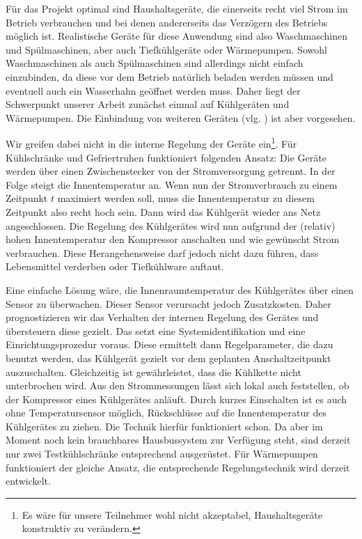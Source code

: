 \documentclass[logo]{fhgart}
\begin{document}
Für das Projekt optimal sind Haushaltsgeräte, die einerseits recht viel
Strom im Betrieb verbrauchen und bei denen andererseits das Verzögern
des Betriebs möglich ist. Realistische Geräte für diese Anwendung sind
also Waschmaschinen und Spülmaschinen, aber auch Tiefkühlgeräte oder
Wärmepumpen. Sowohl Waschmaschinen als auch Spülmaschinen sind
allerdings nicht einfach einzubinden, da diese vor dem Betrieb natürlich
beladen werden müssen und eventuell auch ein Wasserhahn geöffnet werden
muss. Daher liegt der Schwerpunkt unserer Arbeit zunächst einmal auf
Kühlgeräten und Wärmepumpen. Die Einbindung von weiteren Geräten
(vlg. \cite[S. 22]{wiechmann08lastmanagement}) ist aber vorgesehen.

Wir greifen dabei nicht in die interne Regelung der Geräte
ein\footnote{Es wäre für unsere Teilnehmer wohl nicht akzeptabel,
Haushaltsgeräte konstruktiv zu verändern.}. Für
Kühlschränke und Gefriertruhen funktioniert folgenden Ansatz: Die
Geräte werden über einen Zwischenstecker von der Stromversorgung
getrennt. In der Folge steigt die Innentemperatur an. Wenn nun der
Stromverbrauch zu einem Zeitpunkt $t$ maximiert werden soll, muss die
Innentemperatur zu diesem Zeitpunkt also recht hoch sein. Dann wird das
Kühlgerät wieder ans Netz angeschlossen. Die Regelung des Kühlgerätes
wird nun aufgrund der (relativ) hohen Innentemperatur den Kompressor
anschalten und wie gewünscht Strom verbrauchen. Diese Herangehensweise
darf jedoch nicht dazu führen, dass Lebensmittel verderben oder
Tiefkühlware auftaut.

Eine einfache Lösung wäre, die Innenraumtemperatur des Kühlgerätes über
einen Sensor zu überwachen. Dieser Sensor verursacht jedoch
Zusatzkosten. Daher prognostizieren wir das Verhalten der internen
Regelung des Gerätes und übersteuern diese gezielt. Das setzt eine
Systemidentifikation und eine Einrichtungsprozedur voraus. Diese
ermittelt dann Regelparameter, die dazu benutzt werden, das Kühlgerät
gezielt vor dem geplanten Anschaltzeitpunkt auszuschalten. Gleichzeitig
ist gewährleistet, dass die Kühlkette nicht unterbrochen wird. Aus den
Strommessungen lässt sich lokal auch feststellen, ob der Kompressor
eines Kühlgerätes anläuft. Durch kurzes Einschalten ist es auch ohne
Temperatursensor möglich, Rückschlüsse auf die Innentemperatur des
Kühlgerätes zu ziehen. Die Technik hierfür funktioniert schon. Da aber
im Moment noch kein brauchbares Hausbussystem zur Verfügung steht, sind
derzeit nur zwei Testkühlschränke entsprechend ausgerüstet. Für
Wärmepumpen funktioniert der gleiche Ansatz, die entsprechende
Regelungstechnik wird derzeit entwickelt.
\end{document}
